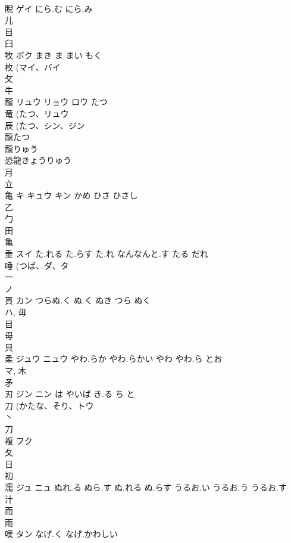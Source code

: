 \documentclass[8pt]{extreport}
\begin{document}
\begin{CJK}{UTF8}{min}
\\	睨	ゲイ	にら.む にら.み	
\\	儿 
\\	目 
\\	臼 
\\	牧	ボク	まき ま まい もく	
\\	枚 (マイ、バイ 
\\	攵 
\\	牛 
\\	龍	リュウ リョウ ロウ	たつ	
\\	竜 (たつ、リュウ 
\\	辰 (たつ、シン、ジン 
\\	龍たつ 
\\	龍りゅう 
\\	恐龍きょうりゅう 
\\	月 
\\	立 
\\	亀	キ キュウ キン	かめ ひさ ひさし	
\\	乙 
\\	勹 
\\	田 
\\	亀 
\\	垂	スイ	た.れる た.らす た.れ なんなんと.す たる だれ	
\\	唾 (つば、ダ、タ 
\\	一 
\\	ノ	
\\	貫	カン	つらぬ.く ぬ.く ぬき つら ぬく	
\\	ハ, 毋 
\\	目 
\\	母 
\\	貝 
\\	柔	ジュウ ニュウ	やわ.らか やわ.らかい やわ やわ.ら とお	
\\	マ, 木 
\\	矛 
\\	刃	ジン ニン	は やいば き.る ち と	
\\	刀 (かたな、そり、トウ 
\\	丶 
\\	刀 
\\	複	フク		
\\	夂 
\\	日 
\\	初 
\\	濡	ジュ ニュ	ぬれ.る ぬら.す ぬ.れる ぬ.らす うるお.い うるお.う うるお.す	
\\	汁 
\\	而 
\\	雨 
\\	嘆	タン	なげ.く なげ.かわしい	

\end{CJK}
\end{document}
